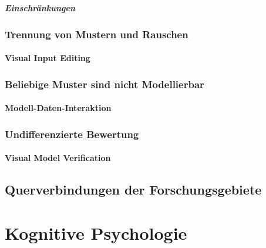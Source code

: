                 \paragraph{Einschränkungen} %

        \subsection{Trennung von Mustern und Rauschen} %

            \subsubsection{Visual Input Editing} %

        \subsection{Beliebige Muster sind nicht Modellierbar} %

            \subsubsection{Modell-Daten-Interaktion} %

        \subsection{Undifferenzierte Bewertung} %

            \subsubsection{Visual Model Verification} %

    \section{Querverbindungen der Forschungsgebiete} %

\chapter{Kognitive Psychologie} %

